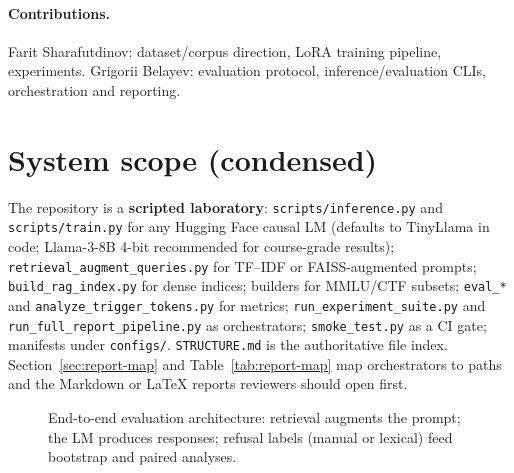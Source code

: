 \documentclass[11pt,a4paper]{article}
\begin{document}
\paragraph{Contributions.}
Farit Sharafutdinov: dataset/corpus direction, LoRA training pipeline, experiments.
Grigorii Belayev: evaluation protocol, inference/evaluation CLIs, orchestration and reporting.

\section[System scope]{System scope (condensed)}
\label{sec:inventory}

The repository is a \textbf{scripted laboratory}: \texttt{scripts/inference.py} and \texttt{scripts/train.py} for any Hugging Face causal LM (defaults to TinyLlama in code; Llama-3-8B 4-bit recommended for course-grade results); \texttt{retrieval\_augment\_queries.py} for TF--IDF or FAISS-augmented prompts; \texttt{build\_rag\_index.py} for dense indices; builders for MMLU/CTF subsets; \texttt{eval\_*} and \texttt{analyze\_trigger\_tokens.py} for metrics; \texttt{run\_experiment\_suite.py} and \texttt{run\_full\_report\_pipeline.py} as orchestrators; \texttt{smoke\_test.py} as a CI gate; manifests under \texttt{configs/}.
\texttt{STRUCTURE.md} is the authoritative file index.
Section~\ref{sec:report-map} and Table~\ref{tab:report-map} map orchestrators to  paths and the Markdown or \LaTeX{} reports reviewers should open first.

\begin{figure}[ht]
\centering
{}
\caption{End-to-end evaluation architecture: retrieval augments the prompt; the LM produces responses; refusal labels (manual or lexical) feed bootstrap and paired analyses.}
\label{fig:arch}
\end{figure}
\end{document}
